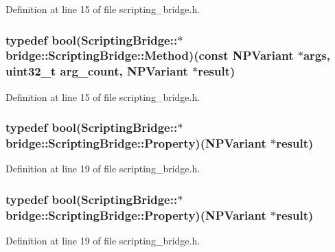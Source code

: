 Definition at line 15 of file scripting\_\-bridge.h.

\hypertarget{classbridge_1_1_scripting_bridge_aa2d60d52b4e91aa7659850b73f393727}{
\subsubsection[{Method}]{\setlength{\rightskip}{0pt plus 5cm}typedef bool(ScriptingBridge::$\ast$ {\bf bridge::ScriptingBridge::Method})(const NPVariant $\ast$args, uint32\_\-t arg\_\-count, NPVariant $\ast$result)}}
\label{classbridge_1_1_scripting_bridge_aa2d60d52b4e91aa7659850b73f393727}


Definition at line 15 of file scripting\_\-bridge.h.

\hypertarget{classbridge_1_1_scripting_bridge_a9063ac1ad0b4e1a439e954e7a505057d}{
\subsubsection[{Property}]{\setlength{\rightskip}{0pt plus 5cm}typedef bool(ScriptingBridge::$\ast$ {\bf bridge::ScriptingBridge::Property})(NPVariant $\ast$result)}}
\label{classbridge_1_1_scripting_bridge_a9063ac1ad0b4e1a439e954e7a505057d}


Definition at line 19 of file scripting\_\-bridge.h.

\hypertarget{classbridge_1_1_scripting_bridge_a9063ac1ad0b4e1a439e954e7a505057d}{
\subsubsection[{Property}]{\setlength{\rightskip}{0pt plus 5cm}typedef bool(ScriptingBridge::$\ast$ {\bf bridge::ScriptingBridge::Property})(NPVariant $\ast$result)}}
\label{classbridge_1_1_scripting_bridge_a9063ac1ad0b4e1a439e954e7a505057d}


Definition at line 19 of file scripting\_\-bridge.h.



